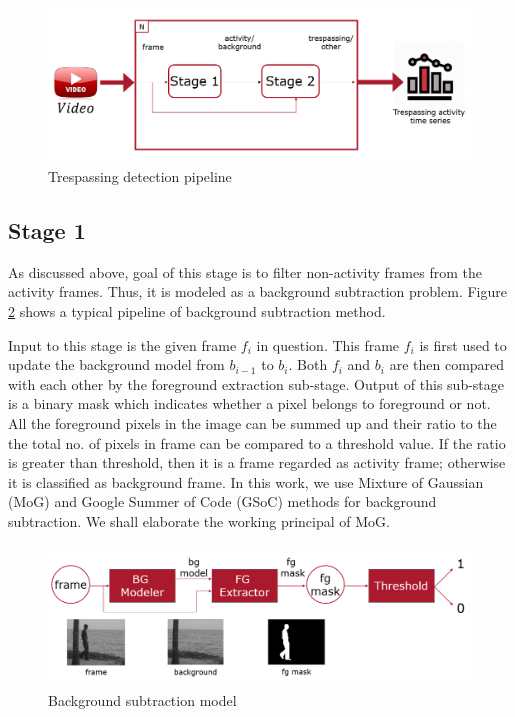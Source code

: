 \begin{figure}
    \centering
    \includegraphics[width=\linewidth]{images/trespassing-detection-pipeline.PNG}
    \caption{Trespassing detection pipeline}
    \label{fig:trespassing-detection-pipeline}
\end{figure}

\subsection{Stage 1}
As discussed above, goal of this stage is to filter non-activity frames from the activity frames. Thus, it is modeled as a background subtraction problem. Figure \ref{fig:background-subtraction-model} shows a typical pipeline of background subtraction method. 

Input to this stage is the given frame $f_i$ in question. This frame $f_i$ is first used to update the background model from $b_{i-1}$ to $b_i$. Both $f_i$ and $b_i$ are then compared with each other by the foreground extraction sub-stage. Output of this sub-stage is a binary mask which indicates whether a pixel belongs to foreground or not. All the foreground pixels in the image can be summed up and their ratio to the the total no. of pixels in frame can be compared to a threshold value. If the ratio is greater than threshold, then it is a frame regarded as activity frame; otherwise it is classified as background frame. In this work, we use Mixture of Gaussian (MoG) and Google Summer of Code (GSoC) methods for background subtraction. We shall elaborate the working principal of MoG. 
\begin{figure}
    \centering
    \includegraphics[width=\linewidth]{images/background-subtraction-model.PNG}
    \caption{Background subtraction model}
    \label{fig:background-subtraction-model}
\end{figure}

